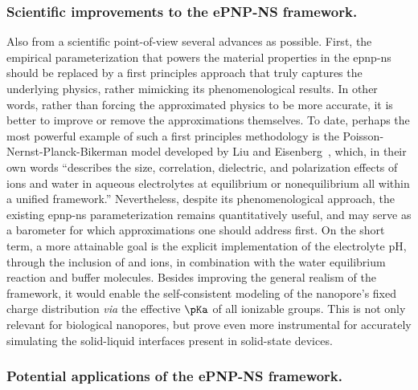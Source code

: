 \subsubsection{Scientific improvements to the {ePNP-NS} framework.}
%

Also from a scientific point-of-view several advances as possible. First, the empirical parameterization that
powers the material properties in the \gls{epnp-ns} should be replaced by a first principles approach that
truly captures the underlying physics, rather mimicking its phenomenological results. In other words, rather
than forcing the approximated physics to be more accurate, it is better to improve or remove the
approximations themselves. To date, perhaps the most powerful example of such a first principles methodology
is the Poisson-Nernst-Planck-Bikerman model developed by Liu and Eisenberg~\cite{Liu-2020}, which, in their
own words ``describes the size, correlation, dielectric, and polarization effects of ions and water in aqueous
electrolytes at equilibrium or nonequilibrium all within a unified framework.'' Nevertheless, despite its
phenomenological approach, the existing \gls{epnp-ns} parameterization remains quantitatively useful, and may
serve as a barometer for which approximations one should address first. On the short term, a more attainable
goal is the explicit implementation of the electrolyte pH, through the inclusion of  and  ions,
in combination with the water equilibrium reaction and buffer molecules. Besides improving the general realism
of the framework, it would enable the self-consistent modeling of the nanopore's fixed charge distribution
\textit{via} the effective $\pKa$ of all ionizable groups. This is not only relevant for biological nanopores,
but prove even more instrumental for accurately simulating the solid-liquid interfaces present in solid-state
devices.


\subsubsection{Potential applications of the {ePNP-NS} framework.}
%

